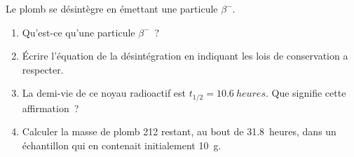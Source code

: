 Le plomb  se désintègre en émettant une particule $\beta^{-}$.
\begin{enumerate}
    \item Qu'est-ce qu'une particule $\beta^{-}$~?
    \item Écrire l'équation de la désintégration en indiquant les
          lois de conservation a respecter.
    \item La demi-vie de ce noyau radioactif est $t_{1/2}=\qty{10.6}{heures}$.
          Que signifie cette affirmation~?
    \item Calculer la masse de plomb 212 restant, au bout de
          \qty{31.8}{heures}, dans un échantillon qui en contenait initialement
          \qty{10}{\gram}.
\end{enumerate}

